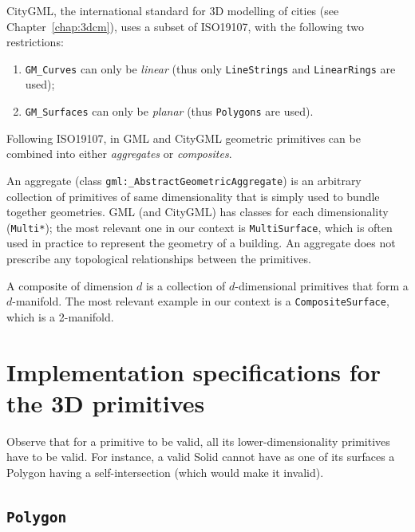 %

CityGML, the international standard for 3D modelling of cities (see Chapter~\ref{chap:3dcm}), uses a subset of ISO19107, with the following two restrictions: 
\begin{enumerate}
  \item \texttt{GM\_Curves} can only be \emph{linear} (thus only \texttt{LineStrings} and \texttt{Li\-near\-Rings} are used); 
  \item \texttt{GM\_Surfaces} can only be \emph{planar} (thus \texttt{Polygons} are used).
\end{enumerate}

%

Following ISO19107, in GML and CityGML geometric primitives can be combined into either \emph{aggregates} or \emph{composites}.

An aggregate (class \texttt{gml:\_AbstractGeometricAggregate}) is an arbitrary collection of primitives of same dimensionality that is simply used to bundle together geometries.
GML (and CityGML) has classes for each dimensionality (\texttt{Multi*}); the most relevant one in our context is \texttt{MultiSurface}, which is often used in practice to represent the geometry of a building.
An aggregate does not prescribe any topological relationships between the primitives.

A composite of dimension $d$ is a collection of $d$-dimensional primitives that form a $d$-manifold. 
The most relevant example in our context is a \texttt{CompositeSurface}, which is a 2-manifold.



%
\section[Implementation specifications]{Implementation specifications for the 3D primitives}%
\label{sec:isovalidity}


Observe that for a primitive to be valid, all its lower-dimensionality primitives have to be valid.
For instance, a valid Solid cannot have as one of its surfaces a Polygon having a self-intersection (which would make it invalid).


\subsection{\texttt{Polygon}}

